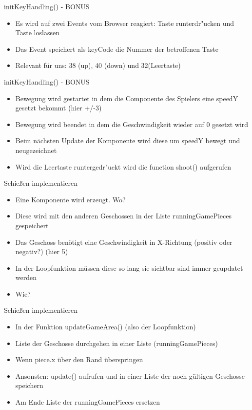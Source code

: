 \documentclass[18pt]{beamer}
\begin{document}
\begin{frame}{initKeyHandling() - BONUS}
\begin{itemize}
	\item Es wird auf zwei Events vom Browser reagiert: Taste runterdr"ucken und Taste loslassen
	\item Das Event speichert als keyCode die Nummer der betroffenen Taste
	\item Relevant für uns: 38 (up), 40 (down) und 32(Leertaste)
	
\end{itemize}
\end{frame}

\begin{frame}{initKeyHandling() - BONUS}
\begin{itemize}
	\item Bewegung wird gestartet in dem die Componente des Spielers eine speedY gesetzt bekommt (hier +/-3)
	\item Bewegung wird beendet in dem die Geschwindigkeit wieder auf 0 gesetzt wird
	\item Beim nächsten Update der Komponente wird diese um speedY bewegt und neugezeichnet
	\item Wird die Leertaste runtergedr"uckt wird die function shoot() aufgerufen
\end{itemize}
\end{frame}

\begin{frame}{Schießen implementieren}
\begin{itemize}
	\item Eine Komponente wird erzeugt. Wo? 
	\item Diese wird mit den anderen Geschossen in der Liste runningGamePieces gespeichert
	\item Das Geschoss benötigt eine Geschwindigkeit in X-Richtung (positiv oder negativ?) (hier 5)
	\item In der Loopfunktion müssen diese so lang sie sichtbar sind immer geupdatet werden
	\item Wie?
\end{itemize}
\end{frame}

\begin{frame}[fragile]{Schießen implementieren}
\begin{itemize}
	\item In der Funktion updateGameArea() (also der Loopfunktion)
	\item Liste der Geschosse durchgehen in einer Liste (runningGamePieces)
	\item Wenn piece.x über den Rand überspringen
	\item Ansonsten: update() aufrufen und in einer Liste der noch gültigen Geschosse speichern
	\item Am Ende Liste der runningGamePieces ersetzen
\end{itemize}
\end{frame}
\end{document}
